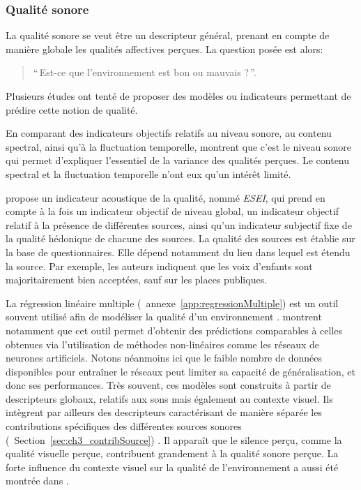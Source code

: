 \subsubsection{Qualité sonore}

La qualité sonore se veut être un descripteur général, prenant en compte de manière globale les qualités affectives perçues. La question posée est alors:

\begin{quote}
``\,Est-ce que l'environnement est bon ou mauvais ?\,''.
\end{quote}

 
Plusieurs études ont tenté de proposer des modèles ou indicateurs permettant de prédire cette notion de qualité.

En comparant des indicateurs objectifs relatifs au niveau sonore, au contenu spectral, ainsi qu'à la fluctuation temporelle, \citep{nilsson2006soundscape,nilsson2007acoustic} montrent que c'est le niveau sonore qui permet d'expliquer l'essentiel de la variance des qualités perçues. Le contenu spectral et la fluctuation temporelle n'ont eux qu'un intérêt limité.

\citep{garcia2012validation} propose un indicateur acoustique de la qualité, nommé \emph{ESEI}, qui prend en compte à la fois un indicateur objectif de niveau global, un indicateur objectif relatif à la présence de différentes sources, ainsi qu'un indicateur subjectif fixe de la qualité hédonique de chacune des sources. La qualité des sources est établie sur la base de questionnaires. Elle dépend notamment du lieu dans lequel est étendu la source. Par exemple, les auteurs indiquent que les voix d'enfants sont majoritairement bien acceptées, sauf sur les places publiques.

La régression linéaire multiple (\cf~annexe~\ref{app:regressionMultiple}) est un outil souvent utilisé afin de modéliser la qualité d'un environnement \citep{ricciardi2015sound}. \citep{brocolini2012prediction} montrent notamment que cet outil permet d'obtenir des prédictions comparables à celles obtenues via l'utilisation de méthodes non-linéaires comme les réseaux de neurones artificiels. Notons néanmoins ici que le faible nombre de données disponibles pour entraîner le réseaux peut limiter sa capacité de généralisation, et donc ses performances. Très souvent, ces modèles sont construits à partir de descripteurs globaux, relatifs aux sons mais également au contexte visuel. Ils intègrent par ailleurs des descripteurs caractérisant de manière séparée les contributions spécifiques des différentes sources sonores (\cf~Section~\ref{sec:ch3_contribSource}) \citep{ricciardi2015sound,brocolini2012prediction}. Il apparaît que le silence perçu,  comme la qualité visuelle perçue, contribuent grandement à la qualité sonore perçue. La forte influence du contexte visuel sur la qualité de l'environnement a aussi été montrée dans \citep{hong2013designing}.

